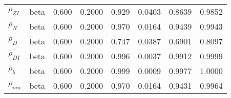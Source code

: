 \begin{center}
\begin{longtable}{llcccccc}
${\rho_{ZI}}$ & beta &   0.600 & 0.2000 &   0.929& 0.0403 &  0.8639 &  0.9852 \\ 
${\rho_N}$ & beta &   0.600 & 0.2000 &   0.970& 0.0164 &  0.9439 &  0.9943 \\ 
${\rho_D}$ & beta &   0.600 & 0.2000 &   0.747& 0.0387 &  0.6901 &  0.8097 \\ 
${\rho_{DI}}$ & beta &   0.600 & 0.2000 &   0.996& 0.0037 &  0.9912 &  0.9999 \\ 
${\rho_b}$ & beta &   0.600 & 0.2000 &   0.999& 0.0009 &  0.9977 &  1.0000 \\ 
${\rho_{mu}}$ & beta &   0.600 & 0.2000 &   0.970& 0.0164 &  0.9431 &  0.9964 \\ 
\end{longtable}
 \end{center}
